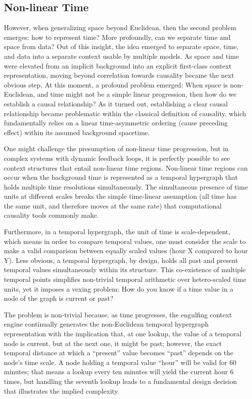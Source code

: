 \subsection{Non-linear Time}

However, when generalizing space beyond Euclidean, then the second problem emerges: how to represent time? More profoundly, can we separate time and space from data? Out of this insight, the idea emerged to separate space, time, and data into a separate context usable by multiple models. As space and time were elevated from an implicit background into an explicit first-class context representation, moving beyond correlation towards causality became the next obvious step. At this moment, a profound problem emerged: When space is non-Euclidean, and time might not be a simple linear progression, then how do we establish a causal relationship?
As it turned out, establishing a clear causal relationship became problematic within the classical definition of causality, which fundamentally relies on a linear time-asymmetric ordering (cause preceding effect) within its assumed background spacetime.

One might challenge the presumption of non-linear time progression, but in complex systems with dynamic feedback loops, it is perfectly possible to see context structures that entail non-linear time regions. Non-linear time regions can occur when the background time is represented as a temporal hypergraph that holds multiple time resolutions simultaneously. The simultaneous presence of time units at different scales breaks the simple time-linear assumption (all time has the same unit, and therefore moves at the same rate) that computational causality tools commonly make.

Furthermore, in a temporal hypergraph, the unit of time is scale-dependent, which means in order to compare temporal values, one must consider the scale to make a valid comparison between equally scaled values (hour X compared to hour Y). Less obvious, a temporal hypergraph, by design, holds all past and present temporal values simultaneously within its structure. This co-existence of multiple temporal points simplifies non-trivial temporal arithmetic over hetero-scaled time units, yet it imposes a vexing problem: How do you know if a time value in a node of the graph is current or past?

The problem is non-trivial because, as time progresses, the engulfing context engine continually generates the non-Euclidean temporal hypergraph representation with the implication that, at one lookup, the value of a temporal node is current, but at the next one, it might be past; however, the exact temporal distance at which a “present” value becomes “past” depends on the node's time scale. A node holding a temporal value “hour” will be valid for 60 minutes; that means a lookup every ten minutes will yield the current hour 6 times, but handling the seventh lookup leads to a fundamental design decision that illustrates the implied complexity.

